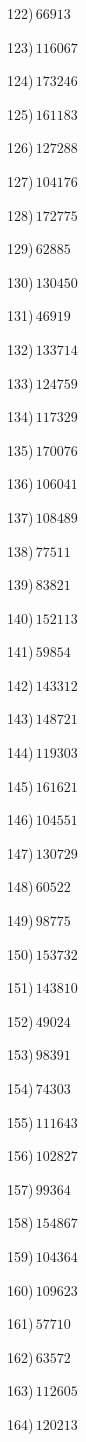 \documentclass{article}
\begin{document}
\begin{multicols}{2}
122)$\,66913$ \par 
123)$\,116067$ \par 
124)$\,173246$ \par 
125)$\,161183$ \par 
126)$\,127288$ \par 
127)$\,104176$ \par 
128)$\,172775$ \par 
129)$\,62885$ \par 
130)$\,130450$ \par 
131)$\,46919$ \par 
132)$\,133714$ \par 
133)$\,124759$ \par 
134)$\,117329$ \par 
135)$\,170076$ \par 
136)$\,106041$ \par 
137)$\,108489$ \par 
138)$\,77511$ \par 
139)$\,83821$ \par 
140)$\,152113$ \par 
141)$\,59854$ \par 
142)$\,143312$ \par 
143)$\,148721$ \par 
144)$\,119303$ \par 
145)$\,161621$ \par 
146)$\,104551$ \par 
147)$\,130729$ \par 
148)$\,60522$ \par 
149)$\,98775$ \par 
150)$\,153732$ \par 
151)$\,143810$ \par 
152)$\,49024$ \par 
153)$\,98391$ \par 
154)$\,74303$ \par 
155)$\,111643$ \par 
156)$\,102827$ \par 
157)$\,99364$ \par 
158)$\,154867$ \par 
159)$\,104364$ \par 
160)$\,109623$ \par 
161)$\,57710$ \par 
162)$\,63572$ \par 
163)$\,112605$ \par 
164)$\,120213$ \par 

\end{multicols}
\end{document}
